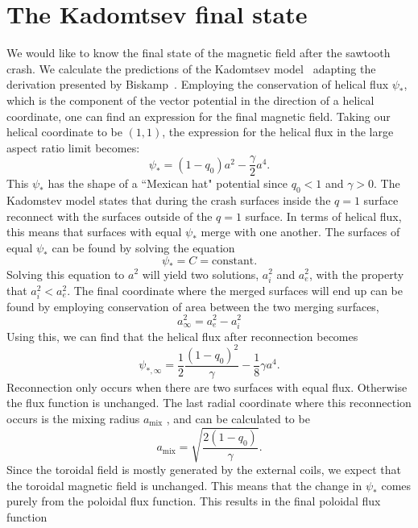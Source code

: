 \documentclass[%
superscriptaddress,
amsmath,amssymb,
aps,
pre,
floatfix,
]{revtex4-2}
\begin{document}
\section*{The Kadomtsev final state}
We would like to know the final state of the magnetic field after the sawtooth crash. We calculate the predictions of the Kadomtsev model~\cite{kadomtsev1975disruptive} adapting the derivation presented by Biskamp~\cite{Biskamp1997}. Employing the conservation of helical flux $\psi_*$, which is the component of the vector potential in the direction of a helical coordinate, one can find an expression for the final magnetic field. Taking our helical coordinate to be $(1,1)$, the expression for the helical flux in the large aspect ratio limit becomes:
\begin{equation}
    \psi_{*} = (1-q_0)a^2 - \frac{\gamma}{2}a^4.
\end{equation}
This $\psi_*$ has the shape of a ``Mexican hat" potential since $q_0<1$ and $\gamma>0$. The Kadomstev model states that during the crash surfaces inside the $q=1$ surface reconnect with the surfaces outside of the $q=1$ surface. In terms of helical flux, this means that surfaces with equal $\psi_*$ merge with one another.  The surfaces of equal $\psi_*$ can be found by solving the equation
\begin{equation}
    \psi_{*} = C = \text{constant.}
\end{equation}
Solving this equation to $a^2$ will yield two solutions, $a_i^2$ and $a_e^2$, with the property that $a_i^2 < a_e^2$. The final coordinate where the merged surfaces will end up can be found by employing conservation of area between the two merging surfaces,
\begin{equation}
    a_{\infty}^2 = a_e^2 - a_i^2
\end{equation}
Using this, we can find that the helical flux after reconnection becomes
\begin{equation}
    \psi_{*,\infty} = \frac{1}{2}\frac{(1-q_0)^2}{\gamma} - \frac{1}{8} \gamma a^4.
    \label{eq:final-helical-flux}
\end{equation}
Reconnection only occurs when there are two surfaces with equal flux. Otherwise the flux function is unchanged. The last radial coordinate where this reconnection occurs is the mixing radius $a_{\text{mix}}$ , and can be calculated to be
\begin{equation}
    a_{\text{mix}} = \sqrt{ \frac{2(1-q_0)}{\gamma} }.
\end{equation}
Since the toroidal field is mostly generated by the external coils, we expect that the toroidal magnetic field is unchanged. This means that the change in $\psi_*$ comes purely from the poloidal flux function. This results in the final poloidal flux function
\end{document}
